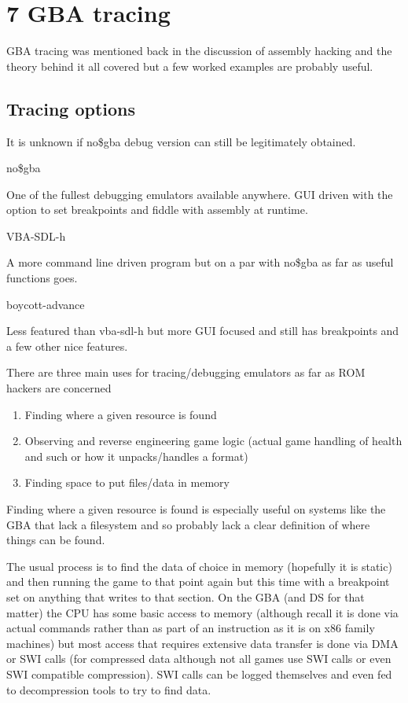 \documentclass[
]{book}
\providecommand{\tightlist}{%
  \setlength{\itemsep}{0pt}\setlength{\parskip}{0pt}}
\begin{document}
\hypertarget{gba-tracing}{%
\chapter{7 GBA tracing}\label{gba-tracing}}

GBA tracing was mentioned back in the discussion of assembly hacking and the theory behind it all covered but a few worked examples are probably useful.

\hypertarget{tracing-options}{%
\section{Tracing options}\label{tracing-options}}

It is unknown if no\$gba debug version can still be legitimately obtained.

no\$gba

One of the fullest debugging emulators available anywhere. GUI driven with the option to set breakpoints and fiddle with assembly at runtime.

VBA-SDL-h

A more command line driven program but on a par with no\$gba as far as useful functions goes.

boycott-advance

Less featured than vba-sdl-h but more GUI focused and still has breakpoints and a few other nice features.

There are three main uses for tracing/debugging emulators as far as ROM hackers are concerned

\begin{enumerate}
\def\labelenumi{\arabic{enumi}.}
\tightlist
\item
  Finding where a given resource is found
\item
  Observing and reverse engineering game logic (actual game handling of health and such or how it unpacks/handles a format)
\item
  Finding space to put files/data in memory
\end{enumerate}

Finding where a given resource is found is especially useful on systems like the GBA that lack a filesystem and so probably lack a clear definition of where things can be found.

The usual process is to find the data of choice in memory (hopefully it is static) and then running the game to that point again but this time with a breakpoint set on anything that writes to that section. On the GBA (and DS for that matter) the CPU has some basic access to memory (although recall it is done via actual commands rather than as part of an instruction as it is on x86 family machines) but most access that requires extensive data transfer is done via DMA or SWI calls (for compressed data although not all games use SWI calls or even SWI compatible compression). SWI calls can be logged themselves and even fed to decompression tools to try to find data.
\end{document}
